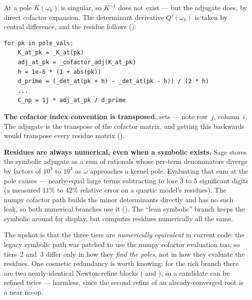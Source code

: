 At a pole $K(\omega_k)$ is singular, so $K^{-1}$ does not exist --- but the
adjugate does, by direct cofactor expansion. The determinant derivative
$Q'(\omega_k)$ is taken by central difference, and the residue follows
():

\begin{lstlisting}
for pk in pole_vals:
    K_at_pk = _K_at(pk)
    adj_at_pk = _cofactor_adj(K_at_pk)
    h = 1e-6 * (1 + abs(pk))
    d_prime = (_det_at(pk + h) - _det_at(pk - h)) / (2 * h)
    ...
    C_np = 1j * adj_at_pk / d_prime
\end{lstlisting}

\begin{gotcha}
\textbf{The cofactor index convention is transposed.}  sets
 --- note
row~$j$, column~$i$. The adjugate is the transpose of the cofactor matrix, and
getting this backwards would transpose every residue matrix
().
\end{gotcha}

\begin{gotcha}
\textbf{Residues are always numerical, even when a symbolic 
exists.} Sage stores the symbolic adjugate as a sum of rationals whose per-term
denominators diverge by factors of $10^3$ to $10^4$ as $\omega$ approaches a
kernel pole. Evaluating that sum at the pole causes  --- nearly-equal large terms subtracting to lose $3$ to $5$
significant digits (a measured $11\%$ to $42\%$ relative error on a quartic
model's residues). The numpy cofactor path builds the minor determinants directly
and has no such leak, so both numerical branches use it
(). The ``lean symbolic'' branch keeps the
symbolic  around for display, but computes residues numerically all
the same.
\end{gotcha}

\begin{note}
The upshot is that the three tiers are \emph{numerically equivalent} in current
code: the legacy symbolic path was patched to use the numpy cofactor evaluation
too, so tiers~2 and~3 differ only in how they \emph{find the poles}, not in how
they evaluate the residues. One cosmetic redundancy is worth knowing: for the
rich branch there are two nearly-identical Newton-refine blocks
( and ), so a candidate can be
refined twice --- harmless, since the second refine of an already-converged root
is a near no-op.
\end{note}

